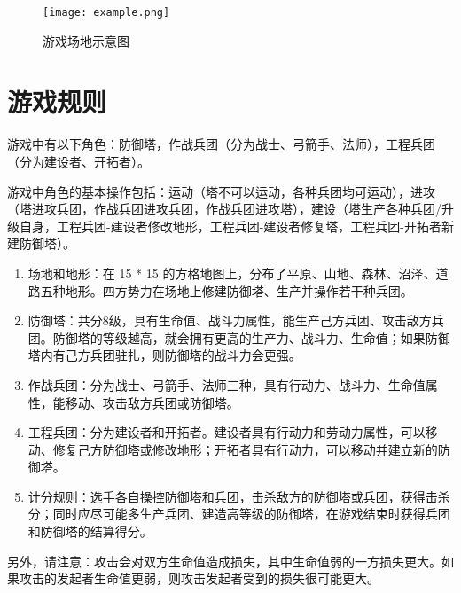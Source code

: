 \documentclass[a4paper,4pt]{article}
\begin{document}
\begin{figure}[htbp]   %
  \centering
  \texttt{[image: example.png]}
  \caption{游戏场地示意图}
  \label{jpg:示例图片1}
\end{figure}



\section{游戏规则}
游戏中有以下角色：防御塔，作战兵团（分为战士、弓箭手、法师），工程兵团（分为建设者、开拓者）。\par
游戏中角色的基本操作包括：运动（塔不可以运动，各种兵团均可运动），进攻（塔进攻兵团，作战兵团进攻兵团，作战兵团进攻塔），建设（塔生产各种兵团/升级自身，工程兵团-建设者修改地形，工程兵团-建设者修复塔，工程兵团-开拓者新建防御塔）。
\begin{enumerate}[fullwidth, itemindent=2em, label=(\arabic*)]
  \item 场地和地形：在 15 * 15 的方格地图上，分布了平原、山地、森林、沼泽、道路五种地形。四方势力在场地上修建防御塔、生产并操作若干种兵团。
  \item 防御塔：共分8级，具有生命值、战斗力属性，能生产己方兵团、攻击敌方兵团。防御塔的等级越高，就会拥有更高的生产力、战斗力、生命值；如果防御塔内有己方兵团驻扎，则防御塔的战斗力会更强。
  \item 作战兵团：分为战士、弓箭手、法师三种，具有行动力、战斗力、生命值属性，能移动、攻击敌方兵团或防御塔。
  \item 工程兵团：分为建设者和开拓者。建设者具有行动力和劳动力属性，可以移动、修复己方防御塔或修改地形；开拓者具有行动力，可以移动并建立新的防御塔。
  \item 计分规则：选手各自操控防御塔和兵团，击杀敌方的防御塔或兵团，获得击杀分；同时应尽可能多生产兵团、建造高等级的防御塔，在游戏结束时获得兵团和防御塔的结算得分。
\end{enumerate}
另外，请注意：攻击会对双方生命值造成损失，其中生命值弱的一方损失更大。如果攻击的发起者生命值更弱，则攻击发起者受到的损失很可能更大。
\end{document}
